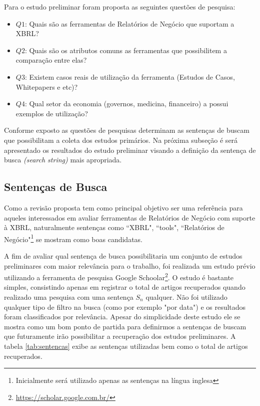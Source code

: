 \documentclass{article}
\begin{document}
Para o estudo preliminar foram proposta as seguintes questões de pesquisa:
\begin{itemize}
  \item \textbf{$Q1$}: Quais são as ferramentas de Relatórios de Negócio que
    suportam a XBRL?
  \item \textbf{$Q2$}: Quais são os atributos comuns as ferramentas
    que possibilitem a comparação entre elas?
  \item \textbf{$Q3$}: Existem casos reais de utilização da ferramenta
    (Estudos de Casos, Whitepapers e etc)?
  \item \textbf{$Q4$}: Qual setor da economia (governos, medicina, financeiro) a
    possui exemplos de utilização?
\end{itemize}

Conforme exposto as questões de pesquisas determinam as sentenças de
buscam que possibilitam a coleta dos estudos primários. Na próxima
subseção é será apresentado os resultados do estudo preliminar visando
a definição da sentença de busca \textit{(search string)} mais apropriada.

\subsection{Sentenças de Busca}
\label{subsec:setences}

Como a revisão proposta tem como principal objetivo ser uma referência para aqueles interessados em avaliar ferramentas de Relatórios de Negócio com suporte à XBRL, naturalmente sentenças como ``XBRL", ``tools", ``Relatórios de Negócio"\footnote{Inicialmente será utilizado apenas as sentenças na língua inglesa} se mostram como boas candidatas.

A fim de avaliar qual sentença de busca possibilitaria um conjunto de
estudos preliminares com maior relevância para o trabalho, foi
realizada um estudo prévio utilizando a ferramenta de pesquisa Google
Schoolar\footnote{\url{https://scholar.google.com.br/}}. O estudo é
bastante simples, consistindo apenas em registrar o total de artigos
recuperados quando realizado uma pesquisa com uma sentença $S_n$
qualquer. Não foi utilizado qualquer tipo de filtro na busca (como por
exemplo "por data") e os resultados foram classificados por
relevância. Apesar do simplicidade deste estudo ele se mostra como um
bom ponto de partida para definirmos a sentenças de buscam que
futuramente irão possibilitar a recuperação dos estudos preliminares. A tabela \ref{tab:sentencas} exibe as sentenças utilizadas bem como o total de artigos recuperados.
\end{document}
